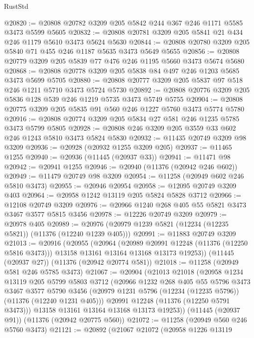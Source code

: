 \begin{lexlean}{RustStd}
\begin{coremodule}
{{{{{{{{{{{{{{{{{{{@20820 := @20808 @20782 @3209 @205 @5842 @244 @367 @246 @1171 @5585 @3473 @5599 @5605
@20832 := @20808 @20781 @3209 @205 @5841 @21 @434 @246 @1179 @5610 @3473 @5624 @5630
@20844 := @20808 @20780 @3209 @205 @5840 @71 @455 @246 @1187 @5635 @3473 @5649 @5655
@20856 := @20808 @20779 @3209 @205 @5839 @77 @476 @246 @1195 @5660 @3473 @5674 @5680
@20868 := @20808 @20778 @3209 @205 @5838 @84 @497 @246 @1203 @5685 @3473 @5699 @5705
@20880 := @20808 @20777 @3209 @205 @5837 @97 @518 @246 @1211 @5710 @3473 @5724 @5730
@20892 := @20808 @20776 @3209 @205 @5836 @128 @539 @246 @1219 @5735 @3473 @5749 @5755
@20904 := @20808 @20775 @3209 @205 @5835 @91 @560 @246 @1227 @5760 @3473 @5774 @5780
@20916 := @20808 @20774 @3209 @205 @5834 @27 @581 @246 @1235 @5785 @3473 @5799 @5805
@20928 := @20808 @246 @3209 @205 @3559 @33 @602 @246 @1243 @5810 @3473 @5824 @5830
@20932 := @11435 @20749 @3209 @98 @3209
@20936 := @20928 (@20932 @1255 @3209 @205)
@20937 := @11465 @1255
@20940 := @20936 (@11445 (@20937 @33))
@20941 := @11471 @98
@20942 := @20941 @1255
@20946 := @20940 (@11376 (@20942 @246 @602))
@20949 := @11479 @20749 @98 @3209
@20954 := @11258 (@20949 @602 @246 @5810 @3473)
@20955 := @20946 @20954
@20958 := @12095 @20749 @3209 @403
@20964 := @20958 @1242 @13119 @205 @5824 @5828 @3712
@20966 := @12108 @20749 @3209
@20976 := @20966 @1240 @268 @405 @55 @5821 @3473 @3467 @3577 @5815 @3456
@20978 := @12226 @20749 @3209
@20979 := @20978 @405
@20989 := @20976 (@20979 @1239 @5821 (@12234 (@12235 @5821)) (@11376 (@12240 @1239 @405)))
@20991 := @11883 @20749 @3209
@21013 := @20916
    (@20955
      (@20964
        (@20989 @20991 @12248 (@11376 (@12250 @5816 @3473)))
        @13158
        @13161
        @13164
        @13168
        @13173
        @19253))
    (@11445 (@20937 @27))
    (@11376 (@20942 @20774 @581))
@21018 := @11258 (@20949 @581 @246 @5785 @3473)
@21067 := @20904
    (@21013
      @21018
      (@20958
        @1234
        @13119
        @205
        @5799
        @5803
        @3712
        (@20966
          @1232
          @268
          @405
          @55
          @5796
          @3473
          @3467
          @3577
          @5790
          @3456
          (@20979 @1231 @5796 (@12234 (@12235 @5796)) (@11376 (@12240 @1231 @405)))
          @20991
          @12248
          (@11376 (@12250 @5791 @3473)))
        @13158
        @13161
        @13164
        @13168
        @13173
        @19253))
    (@11445 (@20937 @91))
    (@11376 (@20942 @20775 @560))
@21072 := @11258 (@20949 @560 @246 @5760 @3473)
@21121 := @20892
    (@21067
      @21072
      (@20958
        @1226
        @13119
}}}}}}}}}}}}}}}}}}}
\end{coremodule}
\end{lexlean}
